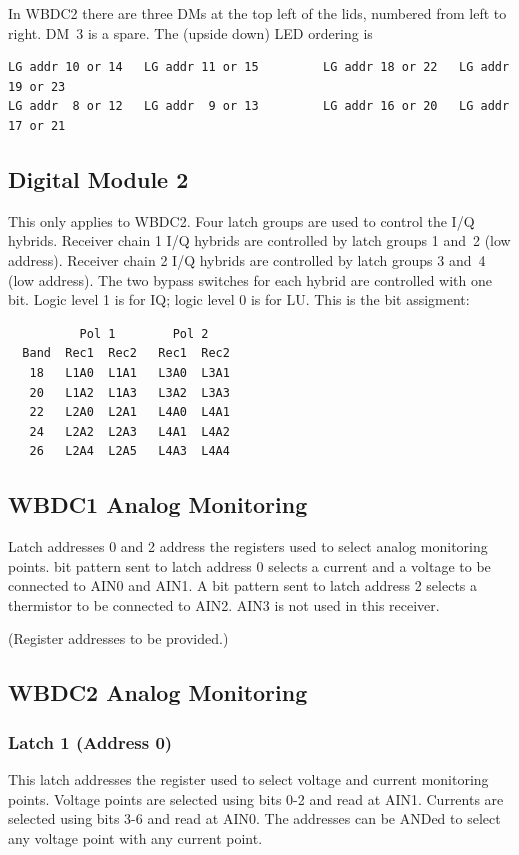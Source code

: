 \documentclass[letterpaper,11pt]{book}
\begin{document}
In WBDC2 there are three DMs at the top left of the lids, numbered from left
to right.  DM~3 is a spare. The (upside down) LED ordering is
\begin{verbatim}
LG addr 10 or 14   LG addr 11 or 15         LG addr 18 or 22   LG addr 19 or 23
LG addr  8 or 12   LG addr  9 or 13         LG addr 16 or 20   LG addr 17 or 21
\end{verbatim}

\subsection{Digital Module 2}

This only applies to WBDC2.  Four latch groups are used to control the I/Q
hybrids.
Receiver chain 1 I/Q hybrids are controlled by latch groups 1 and~2 (low 
address). Receiver chain 2 I/Q hybrids are controlled by latch groups 3 and~4
(low address).
The two bypass switches for each hybrid are controlled with one bit.
Logic level 1 is for IQ; logic level 0 is for LU.
This is the bit assigment:
\begin{verbatim}
          Pol 1        Pol 2
  Band  Rec1  Rec2   Rec1  Rec2
   18   L1A0  L1A1   L3A0  L3A1
   20   L1A2  L1A3   L3A2  L3A3
   22   L2A0  L2A1   L4A0  L4A1
   24   L2A2  L2A3   L4A1  L4A2
   26   L2A4  L2A5   L4A3  L4A4
\end{verbatim}
   
\subsection{WBDC1 Analog Monitoring}

Latch addresses 0 and 2 address the
registers used to select analog monitoring points.
bit pattern sent to latch address 0 selects a current and a voltage
to be connected to AIN0 and AIN1.  A bit pattern sent to latch address
2 selects a thermistor to be connected to AIN2.  AIN3 is not used in this
receiver.

(Register addresses to be provided.)

\subsection{WBDC2 Analog Monitoring}

\subsubsection{Latch 1 (Address 0)}

This latch addresses the register used to select voltage and current monitoring
points.  Voltage points are
selected using bits 0-2 and read at AIN1.  Currents are selected using bits
3-6 and read at AIN0.  The addresses can be ANDed to select any voltage point
with any current point.  
\end{document}
